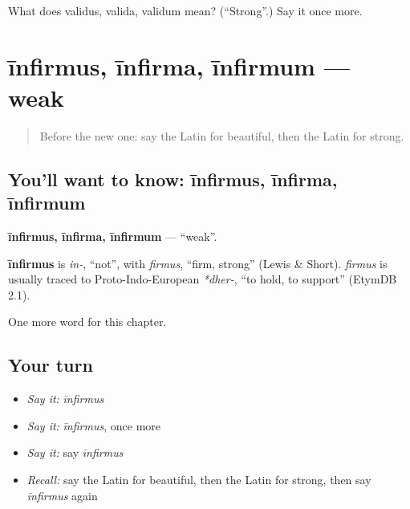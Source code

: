 \begin{tcolorbox}[breakable,colback=teal!4,colframe=teal!35!black,title={Before you move on}]
What does validus, valida, validum mean? (\textquotedblleft{}Strong\textquotedblright{}.) Say it once more.
\end{tcolorbox}
\section[īnfirmus, īnfirma, īnfirmum]{īnfirmus, īnfirma, īnfirmum — weak}

\label{lesson:LA-C152-infirmus}



\begin{quote}
Before the new one: say the Latin for beautiful, then the Latin for strong.
\end{quote}

\subsection*{You'll want to know: īnfirmus, īnfirma, īnfirmum}
\textbf{īnfirmus, īnfirma, īnfirmum} — \textquotedblleft{}weak\textquotedblright{}.

\begin{cousinweb}
\textbf{īnfirmus} is \emph{in-}, \textquotedblleft{}not\textquotedblright{}, with \emph{firmus}, \textquotedblleft{}firm, strong\textquotedblright{} (Lewis \& Short). \emph{firmus} is usually traced to Proto-Indo-European \emph{*dher-}, \textquotedblleft{}to hold, to support\textquotedblright{} (EtymDB 2.1).
\end{cousinweb}

\begin{grammarlens}[title={What you've built}]
One more word for this chapter.
\end{grammarlens}

\subsection*{Your turn}
\begin{itemize}
\raggedright
  \item \emph{Say it:} \emph{īnfirmus}
  \item \emph{Say it:} \emph{īnfirmus}, once more
  \item \emph{Say it:} say \emph{īnfirmus}
  \item \emph{Recall:} say the Latin for beautiful, then the Latin for strong, then say \emph{īnfirmus} again
\end{itemize}

